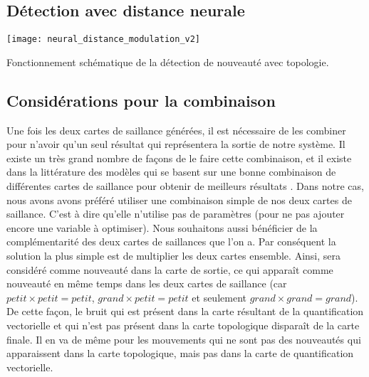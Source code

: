 	\subsection{Détection avec distance neurale}

	\begin{figureth}
		\texttt{[image: neural\_distance\_modulation\_v2]}
		\caption[Détection de nouveauté avec topologie]{Fonctionnement schématique de la détection de nouveauté avec topologie.}\label{fig:img:topo}
	\end{figureth}


	\subsection{Considérations pour la combinaison}
	
	Une fois les deux cartes de saillance générées, il est nécessaire de les combiner pour n'avoir qu'un seul résultat qui représentera la sortie de notre système. Il existe un très grand nombre de façons de le faire cette combinaison, et il existe dans la littérature des modèles qui se basent sur une bonne combinaison de différentes cartes de saillance pour obtenir de meilleurs résultats \nocite{todo}. Dans notre cas, nous avons avons préféré utiliser une combinaison simple de nos deux cartes de saillance. C'est à dire qu'elle n'utilise pas de paramètres (pour ne pas ajouter encore une variable à optimiser). Nous souhaitons aussi bénéficier de la complémentarité des deux cartes de saillances que l'on a. Par conséquent la solution la plus simple est de multiplier les deux cartes ensemble. Ainsi, sera considéré comme nouveauté dans la carte de sortie, ce qui apparaît comme nouveauté en même temps dans les deux cartes de saillance (car $\textit{petit} \times \textit{petit} = \textit{petit}$, $\textit{grand} \times \textit{petit} = \textit{petit}$ et seulement $\textit{grand} \times \textit{grand} = \textit{grand}$). De cette façon, le bruit qui est présent dans la carte résultant de la quantification vectorielle et qui n'est pas présent dans la carte topologique disparaît de la carte finale. Il en va de même pour les mouvements qui ne sont pas des nouveautés qui apparaissent dans la carte topologique, mais pas dans la carte de quantification vectorielle.

